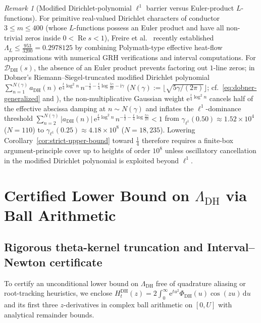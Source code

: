 \documentclass[11pt,a4paper,reqno]{amsart}
\theoremstyle{definition}
\theoremstyle{remark}
\newtheorem{remark}[theorem]{Remark}
\numberwithin{equation}{section}
\newcommand{\dd}{\mathrm{d}}
\newcommand{\ii}{\mathrm{i}}
\newcommand{\ee}{\mathrm{e}}
\DeclareMathOperator{\Reop}{Re}
\begin{document}
\begin{remark}[Modified Dirichlet-polynomial $\ell^1$ barrier versus Euler-product $L$-functions]
\label{rem:dobner-barrier}
For primitive real-valued Dirichlet characters of conductor $3 \le m \le 400$ (whose $L$-functions possess an Euler product and have all non-trivial zeros inside $0 < \Reop s < 1$), Freire et al.\ \cite{freire2026} recently established $\Lambda_L \le \frac{953}{3200} = 0.2978125$ by combining Polymath-type effective heat-flow approximations \cite{polymath2019} with numerical GRH verifications and interval computations. For $\mathcal{D}_{\mathrm{DH}}(s)$, the absence of an Euler product prevents factoring out $1$-line zeros; in Dobner's Riemann--Siegel-truncated modified Dirichlet polynomial $\sum_{n=1}^{N(\gamma)} a_{\mathrm{DH}}(n)\,\ee^{\frac{t}{4}\log^2 n}\,n^{-\frac{1}{2} - \frac{t}{4}\log\frac{5\gamma}{2\pi} - \ii\gamma}$ ($N(\gamma) := \lfloor\sqrt{5\gamma/(2\pi)}\rfloor$; cf.\ \eqref{eq:dobner-generalized} and \cite[Lem.~2.3]{dobner2021}), the non-multiplicative Gaussian weight $\ee^{\frac{t}{4}\log^2 n}$ cancels half of the effective abscissa damping at $n \sim N(\gamma)$ and inflates the $\ell^1$-dominance threshold $\sum_{n=2}^{N(\gamma)}|a_{\mathrm{DH}}(n)|\,\ee^{\frac{t}{4}\log^2 n}\,n^{-\frac{1}{2} - \frac{t}{4}\log\frac{5\gamma}{2\pi}} < 1$ from $\gamma_{\ell^1}(0.50) \approx 1.52 \times 10^4$ ($N = 110$) to $\gamma_{\ell^1}(0.25) \approx 4.18 \times 10^8$ ($N = 18{,}235$). Lowering Corollary~\ref{cor:strict-upper-bound} toward $\frac{1}{4}$ therefore requires a finite-box argument-principle cover up to heights of order $10^8$ unless oscillatory cancellation in the modified Dirichlet polynomial is exploited beyond $\ell^1$.
\end{remark}

\section{Certified Lower Bound on $\Lambda_{\mathrm{DH}}$ via Ball Arithmetic}
\label{sec:lower-bound}

\subsection{Rigorous theta-kernel truncation and Interval--Newton certificate}
\label{subsec:interval-newton}

To certify an unconditional lower bound on $\Lambda_{\mathrm{DH}}$ free of quadrature aliasing or root-tracking heuristics, we enclose $H_t^{\mathrm{DH}}(z) = 2\int_{0}^{\infty}\ee^{tu^2}\Phi_{\mathrm{DH}}(u)\cos(zu)\,\dd u$ and its first three $z$-derivatives in complex ball arithmetic \cite{johansson2017} on $[0, U]$ with analytical remainder bounds.
\end{document}
